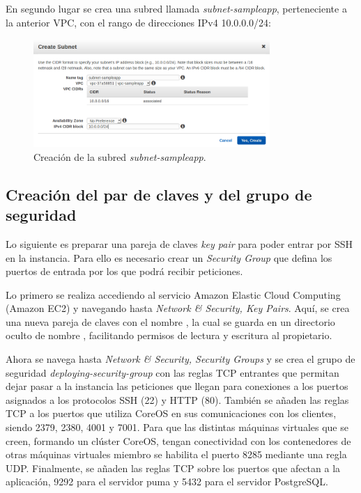 En segundo lugar se crea una subred llamada \textit{subnet-sampleapp}, perteneciente a la anterior VPC, con el rango de direcciones IPv4 10.0.0.0/24:

\begin{figure}[H]
\centering
\includegraphics[width=0.8\textwidth]{images/figures/subnet-sampleapp.png}
\caption{Creación de la subred \textit{subnet-sampleapp}.}
\end{figure}

\subsection{Creación del par de claves y del grupo de seguridad}

Lo siguiente es preparar una pareja de claves \textit{key pair} para poder entrar por SSH en la instancia. Para ello es necesario crear un \textit{Security Group} que defina los puertos de entrada por los que podrá recibir peticiones.

Lo primero se realiza accediendo al servicio Amazon Elastic Cloud Computing (Amazon EC2) y navegando hasta \textit{Network \& Security, Key Pairs}. Aquí, se crea una nueva pareja de claves con el nombre , la cual se guarda en un directorio oculto de nombre , facilitando permisos de lectura y escritura al propietario.

Ahora se navega hasta \textit{Network \& Security, Security Groups} y se crea el grupo de seguridad \textit{deploying-security-group} con las reglas TCP entrantes que permitan dejar pasar a la instancia las peticiones que llegan para conexiones a los puertos asignados a los protocolos SSH (22) y HTTP (80). También se añaden las reglas TCP a los puertos que utiliza CoreOS en sus comunicaciones con los clientes, siendo 2379, 2380, 4001 y 7001. Para que las distintas máquinas virtuales que se creen, formando un clúster CoreOS, tengan conectividad con los contenedores de otras máquinas virtuales miembro se habilita el puerto 8285 mediante una regla UDP. Finalmente, se añaden las reglas TCP sobre los puertos que afectan a la aplicación, 9292 para el servidor puma y 5432 para el servidor PostgreSQL.

